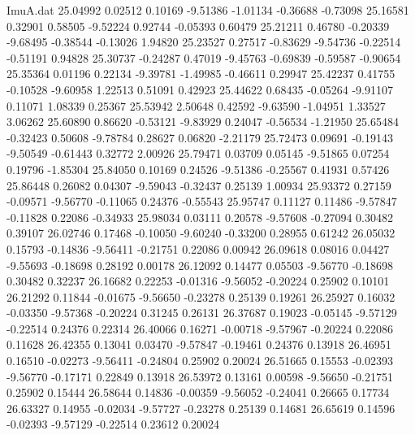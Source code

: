 \begin{filecontents}{ImuA.dat}
  25.04992    0.02512    0.10169   -9.51386   -1.01134   -0.36688   -0.73098
  25.16581    0.32901    0.58505   -9.52224    0.92744   -0.05393    0.60479
  25.21211    0.46780   -0.20339   -9.68495   -0.38544   -0.13026    1.94820
  25.23527    0.27517   -0.83629   -9.54736   -0.22514   -0.51191    0.94828
  25.30737   -0.24287    0.47019   -9.45763   -0.69839   -0.59587   -0.90654
  25.35364    0.01196    0.22134   -9.39781   -1.49985   -0.46611    0.29947
  25.42237    0.41755   -0.10528   -9.60958    1.22513    0.51091    0.42923
  25.44622    0.68435   -0.05264   -9.91107    0.11071    1.08339    0.25367
  25.53942    2.50648    0.42592   -9.63590   -1.04951    1.33527    3.06262
  25.60890    0.86620   -0.53121   -9.83929    0.24047   -0.56534   -1.21950
  25.65484   -0.32423    0.50608   -9.78784    0.28627    0.06820   -2.21179
  25.72473    0.09691   -0.19143   -9.50549   -0.61443    0.32772    2.00926
  25.79471    0.03709    0.05145   -9.51865    0.07254    0.19796   -1.85304
  25.84050    0.10169    0.24526   -9.51386   -0.25567    0.41931    0.57426
  25.86448    0.26082    0.04307   -9.59043   -0.32437    0.25139    1.00934
  25.93372    0.27159   -0.09571   -9.56770   -0.11065    0.24376   -0.55543
  25.95747    0.11127    0.11486   -9.57847   -0.11828    0.22086   -0.34933
  25.98034    0.03111    0.20578   -9.57608   -0.27094    0.30482    0.39107
  26.02746    0.17468   -0.10050   -9.60240   -0.33200    0.28955    0.61242
  26.05032    0.15793   -0.14836   -9.56411   -0.21751    0.22086    0.00942
  26.09618    0.08016    0.04427   -9.55693   -0.18698    0.28192    0.00178
  26.12092    0.14477    0.05503   -9.56770   -0.18698    0.30482    0.32237
  26.16682    0.22253   -0.01316   -9.56052   -0.20224    0.25902    0.10101
  26.21292    0.11844   -0.01675   -9.56650   -0.23278    0.25139    0.19261
  26.25927    0.16032   -0.03350   -9.57368   -0.20224    0.31245    0.26131
  26.37687    0.19023   -0.05145   -9.57129   -0.22514    0.24376    0.22314
  26.40066    0.16271   -0.00718   -9.57967   -0.20224    0.22086    0.11628
  26.42355    0.13041    0.03470   -9.57847   -0.19461    0.24376    0.13918
  26.46951    0.16510   -0.02273   -9.56411   -0.24804    0.25902    0.20024
  26.51665    0.15553   -0.02393   -9.56770   -0.17171    0.22849    0.13918
  26.53972    0.13161    0.00598   -9.56650   -0.21751    0.25902    0.15444
  26.58644    0.14836   -0.00359   -9.56052   -0.24041    0.26665    0.17734
  26.63327    0.14955   -0.02034   -9.57727   -0.23278    0.25139    0.14681
  26.65619    0.14596   -0.02393   -9.57129   -0.22514    0.23612    0.20024

\end{filecontents}
